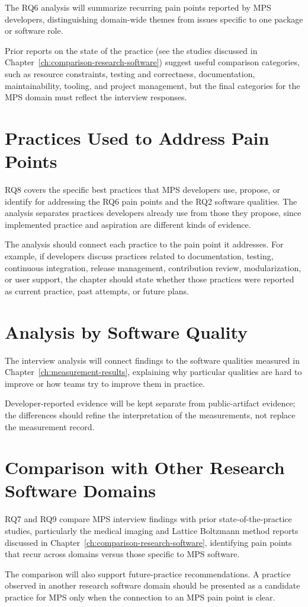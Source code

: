 The RQ6 analysis will summarize recurring pain points reported by MPS developers, distinguishing domain-wide themes from issues specific to one package or software role.

Prior reports on the state of the practice (see the studies discussed in Chapter~\ref{ch:comparison-research-software}) suggest useful comparison categories, such as resource constraints, testing and correctness, documentation, maintainability, tooling, and project management, but the final categories for the MPS domain must reflect the interview responses.

\section{Practices Used to Address Pain Points}
\label{sec:practices-address-pain-points}

RQ8 covers the specific best practices that MPS developers use, propose, or identify for addressing the RQ6 pain points and the RQ2 software qualities. The analysis separates practices developers already use from those they propose, since implemented practice and aspiration are different kinds of evidence.

The analysis should connect each practice to the pain point it addresses. For example, if developers discuss practices related to documentation, testing, continuous integration, release management, contribution review, modularization, or user support, the chapter should state whether those practices were reported as current practice, past attempts, or future plans.

\section{Analysis by Software Quality}
\label{sec:interview-analysis-software-quality}

The interview analysis will connect findings to the software qualities measured in Chapter~\ref{ch:measurement-results}, explaining why particular qualities are hard to improve or how teams try to improve them in practice.

Developer-reported evidence will be kept separate from public-artifact evidence; the differences should refine the interpretation of the measurements, not replace the measurement record.

\section{Comparison with Other Research Software Domains}
\label{sec:interview-cross-domain-comparison}

RQ7 and RQ9 compare MPS interview findings with prior state-of-the-practice studies, particularly the medical imaging and Lattice Boltzmann method reports discussed in Chapter~\ref{ch:comparison-research-software}, identifying pain points that recur across domains versus those specific to MPS software.

The comparison will also support future-practice recommendations. A practice observed in another research software domain should be presented as a candidate practice for MPS only when the connection to an MPS pain point is clear.
